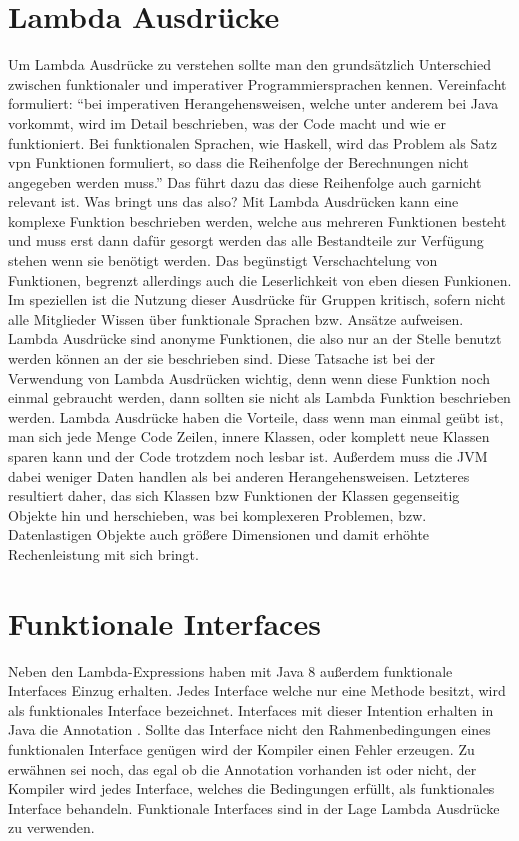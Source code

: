 \section{Lambda Ausdrücke}
\label{sec:Lambda}
Um Lambda Ausdrücke zu verstehen sollte man den grundsätzlich Unterschied
zwischen funktionaler und imperativer Programmiersprachen kennen. Vereinfacht
formuliert: "`bei imperativen Herangehensweisen, welche unter anderem bei Java
vorkommt, wird im Detail beschrieben, was der Code macht und wie er
funktioniert.
Bei funktionalen Sprachen, wie Haskell, wird das Problem als Satz vpn
Funktionen formuliert, so dass die Reihenfolge der Berechnungen nicht angegeben
werden muss."' Das führt dazu das diese Reihenfolge auch garnicht relevant ist.
Was bringt uns das also? Mit Lambda Ausdrücken kann eine komplexe Funktion
beschrieben werden, welche aus mehreren Funktionen besteht und muss erst
dann dafür gesorgt werden das alle Bestandteile zur Verfügung stehen wenn sie
benötigt werden. Das begünstigt Verschachtelung von Funktionen, begrenzt
allerdings auch die Leserlichkeit von eben diesen Funkionen. Im speziellen ist
die Nutzung dieser Ausdrücke für Gruppen kritisch, sofern nicht alle
Mitglieder Wissen über funktionale Sprachen bzw.
Ansätze aufweisen.
Lambda Ausdrücke sind anonyme Funktionen, die also nur an der Stelle benutzt
werden können an der sie beschrieben sind. Diese Tatsache ist bei der Verwendung
von Lambda Ausdrücken wichtig, denn wenn diese Funktion
noch einmal gebraucht werden, dann sollten sie nicht als Lambda Funktion
beschrieben werden.
Lambda Ausdrücke haben die Vorteile, dass wenn man einmal geübt ist, man sich
jede Menge Code Zeilen, innere Klassen, oder komplett neue Klassen sparen kann
und der Code trotzdem noch lesbar ist. Außerdem muss die JVM dabei weniger Daten
handlen als bei anderen Herangehensweisen. Letzteres resultiert daher, das sich
Klassen bzw Funktionen der Klassen gegenseitig Objekte hin und herschieben, was
bei komplexeren Problemen, bzw. Datenlastigen Objekte auch größere Dimensionen
und damit erhöhte Rechenleistung mit sich bringt.

\section{Funktionale Interfaces}
\label{sec:FI}
Neben den Lambda-Expressions haben mit Java 8 außerdem funktionale Interfaces
Einzug erhalten. Jedes Interface welche nur eine Methode besitzt, wird als
funktionales Interface bezeichnet. Interfaces mit dieser Intention erhalten in
Java die Annotation \@FunctionalInterface. Sollte das Interface nicht den
Rahmenbedingungen eines funktionalen Interface genügen wird der Kompiler einen
Fehler erzeugen. Zu erwähnen sei noch, das egal ob die Annotation vorhanden ist
oder nicht, der Kompiler wird jedes Interface, welches die Bedingungen erfüllt,
als funktionales Interface behandeln.
Funktionale Interfaces sind in der Lage Lambda Ausdrücke zu verwenden.

